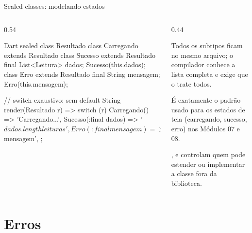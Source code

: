 \documentclass[aspectratio=169,10pt]{beamer}
\begin{document}
\begin{frame}[fragile]{Sealed classes: modelando estados}
  \begin{columns}[T]
    \begin{column}{0.54\textwidth}
\begin{codigo}[title=resultado.dart]{Dart}
sealed class Resultado {}
class Carregando extends Resultado {}
class Sucesso extends Resultado {
  final List<Leitura> dados;
  Sucesso(this.dados);
}
class Erro extends Resultado {
  final String mensagem;
  Erro(this.mensagem);
}

// switch exaustivo: sem default
String render(Resultado r) => switch (r) {
  Carregando() => 'Carregando...',
  Sucesso(:final dados) => '${dados.length} leituras',
  Erro(:final mensagem) => 'Falha: $mensagem',
};
\end{codigo}
    \end{column}
    \begin{column}{0.44\textwidth}
      \begin{conceito}
        Todos os subtipos ficam no mesmo arquivo; o compilador conhece a lista completa e exige que o  trate todos.
      \end{conceito}
      \begin{caixaambar}
        É exatamente o padrão usado para os estados de tela (carregando, sucesso, erro) nos Módulos 07 e 08.
      \end{caixaambar}
      \begin{dica}
        ,  e  controlam quem pode estender ou implementar a classe fora da biblioteca.
      \end{dica}
    \end{column}
  \end{columns}
\end{frame}

\section{Erros}
\end{document}
